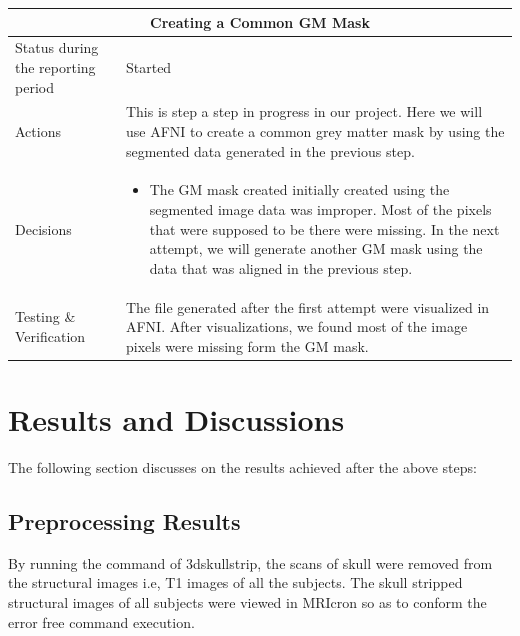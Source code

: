 \documentclass[12pt]{article}
\begin{document}
\begin{table}[H]
  \centering
  \begin{tabular} {| m{3.3cm} | m{11.5cm} | }
    \hline
    \multicolumn{2}{|c|}{Creating a Common GM Mask} \\ \hline
    Status during the reporting period & Started    \\ \hline
    Actions &
    This is step a step in progress in our project. Here we will use
    AFNI to create a common grey matter mask by using the segmented
    data generated in the previous step. \\ \hline

    Decisions &
    \begin{itemize}

      \item The GM mask created initially created using the segmented
        image data was improper. Most of the pixels that were supposed
        to be there were missing. In the next attempt, we will
        generate another GM mask using the data that was aligned in
        the previous step.

    \end{itemize} \\ \hline

    Testing \& Verification &
    The file generated after the first attempt were visualized in
    AFNI. After visualizations, we found most of the image pixels were
    missing form the GM mask. \\ \hline

  \end{tabular}
\end{table}

\newpage
\section{Results and Discussions}

The following section discusses on the results achieved after the
above steps:

\subsection{Preprocessing Results}%
\label{sub:preprocessing_results}



By running the command of 3dskullstrip, the
scans of skull were removed from the structural images i.e, T1 images
of all the subjects. The skull stripped structural images of all
subjects were viewed in MRIcron so as to conform the error free
command execution.
\end{document}
